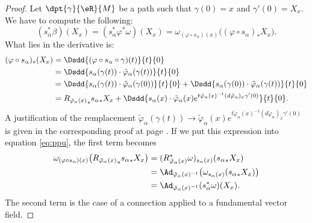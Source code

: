 \begin{proof}
Let $\dpt{\gamma}{\eR}{M}$ be a path such that $\gamma(0)=x$ and $\gamma'(0)=X_x$. We have to compute the following:
\begin{equation}\label{eq:ppu}
  (s_{\alpha}^*\beta)(X_x)=(s_{\alpha}^*\varphi^*\omega)(X_x)=\omega_{(\varphi\circ s_{\alpha})(x)}\big(  (\varphi\circ s_{\alpha})_*X_x  \big).
\end{equation}
What lies in the derivative is:
\begin{equation}
\begin{split}
  (\varphi\circ s_{\alpha})_*(X_x)&=\Dsdd{ (\varphi\circ s_{\alpha}\circ\gamma)(t) }{t}{0}\\
                            &=\Dsdd{  s_{\alpha}(\gamma(t))\cdot\tilde{\varphi}_{\alpha}(\gamma(t))  }{t}{0}\\
                            &=\Dsdd{ s_{\alpha}(\gamma(t))\cdot\tilde{\varphi}_{\alpha}(\gamma(0)) }{t}{0}
                             +\Dsdd{ s_{\alpha}(\gamma(0))\cdot\tilde{\varphi}_{\alpha}(\gamma(t)) }{t}{0}\\
                            &={R_{\tilde{\varphi}_{\alpha}(x)}}_*{s_{\alpha}}_*X_x
                             +\Dsdd{  s_{\alpha}(x)\cdot\tilde{\varphi}_{\alpha}(x)e^{ t\tilde{\varphi}_{\alpha}(x)^{-1}(d\tilde{\varphi}_{\alpha})_x\gamma'(0)}}{t}{0}.
\end{split}
\end{equation}
A justification of the remplacement $\tilde{\varphi}_{\alpha}(\gamma(t))\to \tilde{\varphi}_{\alpha}(x)e^{t\tilde{\varphi}_{\alpha}(x)^{-1}(d\tilde{\varphi}_{\alpha})_x\gamma'(0)}$ is given in the corresponding proof at page \pageref{pg:justif_s}.
If we put this expression into equation \eqref{eq:ppu}, the first term becomes
\[
\begin{split}
   \omega_{(\varphi\circ s_{\alpha})(x)}\big(  {{R_{\tilde{\varphi}_{\alpha}(x)}}_*{s_{\alpha}}_*X_x}   \big)
           &=(R^*_{\tilde{\varphi}_{\alpha}(x)}\omega)_{s_{\alpha}(x)}({s_{\alpha}}_*X_x)\\
           &=\Ad_{\tilde{\varphi}_{\alpha}(x)^{-1}} \big(\omega_{s_{\alpha}(x)} ( {s_{\alpha}}_*X_x ) \big)\\
           &=\Ad_{\tilde{\varphi}_{\alpha}(x)^{-1}}  (s_{\alpha}^*\omega)(X_x).
\end{split}
\]
The second term is the case of a connection applied to a fundamental vector field.

\end{proof}

